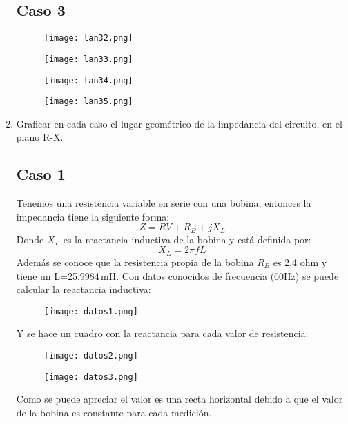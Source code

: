 \documentclass[a4paper,12pt]{report}
\begin{document}
\begin{enumerate}
\subsection*{Caso 3}
\begin{figure}[H]
\centering
\texttt{[image: lan32.png]}
\end{figure}
\begin{figure}[H]
\centering
\texttt{[image: lan33.png]}
\end{figure}
\begin{figure}[H]
\centering
\texttt{[image: lan34.png]}
\end{figure}
\begin{figure}[H]
\centering
\texttt{[image: lan35.png]}
\end{figure}
\item Graficar en cada caso el lugar geométrico de la impedancia del circuito, en el plano R-X.
\subsection*{Caso 1}
Tenemos una resistencia variable en serie con una bobina, entonces la impedancia tiene la siguiente forma:
$$
Z = RV + R_{B} + jX_{L}
$$
Donde $X_{L}$ es la reactancia inductiva de la bobina y está definida por:
$$
X_{L} = 2\pi f L
$$
Además se conoce que la resistencia propia de la bobina $R_{B}$ es 2.4 ohm y tiene un L=25.9984\,mH.
Con datos conocidos de frecuencia (60Hz) se puede calcular la reactancia inductiva:
\begin{figure}[H]
\centering
\texttt{[image: datos1.png]}
\end{figure}
Y se hace un cuadro con la reactancia para cada valor de resistencia:
\begin{figure}[H]
\centering
\texttt{[image: datos2.png]}
\end{figure}
\begin{figure}[H]
\centering
\texttt{[image: datos3.png]}
\end{figure}
Como se puede apreciar el valor es una recta horizontal debido a que el valor de la bobina es constante para cada medición.

\end{enumerate}
\end{document}

